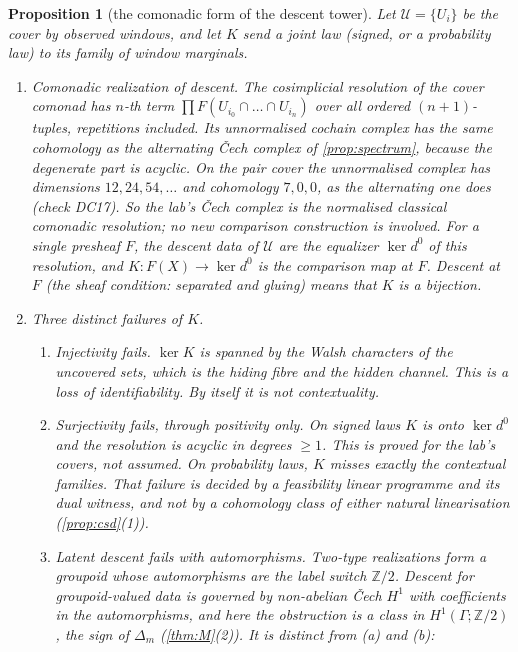 \documentclass[11pt]{article}
\newtheorem{proposition}{Proposition}\newtheorem{corollary}{Corollary}\newtheorem{lemma}{Lemma}
\theoremstyle{definition}\newtheorem{definition}{Definition}\newtheorem{remark}{Remark}
\begin{document}
\begin{proposition}[the comonadic form of the descent tower]\label{prop:comonadic}
Let $\mathcal U=\{U_i\}$ be the cover by observed windows, and let $K$ send a joint law (signed, or a probability law) to its family of
window marginals.
\begin{enumerate}
\item[(i)] \emph{Comonadic realization of descent.} The cosimplicial resolution of the cover comonad has $n$-th term
  $\prod F(U_{i_0}\cap\dots\cap U_{i_n})$ over all ordered $(n+1)$-tuples, repetitions included. Its unnormalised cochain complex has
  the same cohomology as the alternating Čech complex of \cref{prop:spectrum}, because the degenerate part is acyclic. On the pair cover
  the unnormalised complex has dimensions $12,24,54,\dots$ and cohomology $7,0,0$, as the alternating one does (check DC17). So the lab's
  Čech complex \emph{is} the normalised classical comonadic resolution; no new comparison construction is involved. For a single presheaf
  $F$, the descent data of $\mathcal U$ are the equalizer $\ker d^0$ of this resolution, and $K:F(X)\to\ker d^0$ is the comparison map
  at $F$. Descent at $F$ (the sheaf condition: separated and gluing) means that $K$ is a bijection.
\item[(ii)] \emph{Three distinct failures of $K$.}
  \begin{enumerate}
  \item[(a)] \emph{Injectivity fails.} $\ker K$ is spanned by the Walsh characters of the uncovered sets, which is the hiding fibre and
    the hidden channel. This is a loss of identifiability. By itself it is not contextuality.
  \item[(b)] \emph{Surjectivity fails, through positivity only.} On signed laws $K$ is onto $\ker d^0$ and the resolution is acyclic in
    degrees $\ge1$. This is proved for the lab's covers, not assumed. On probability laws, $K$ misses exactly the contextual families.
    That failure is decided by a feasibility linear programme and its dual witness, and not by a cohomology class of either natural
    linearisation (\cref{prop:csd}(1)).
  \item[(c)] \emph{Latent descent fails with automorphisms.} Two-type realizations form a groupoid whose automorphisms are the label switch
    $\mathbb Z/2$. Descent for groupoid-valued data is governed by non-abelian Čech $H^1$ with coefficients in the automorphisms, and
    here the obstruction is a class in $H^1(\Gamma;\mathbb Z/2)$, the sign of $\Delta_m$ (\cref{thm:M}(2)). It is distinct from (a) and (b):

\end{enumerate}
\end{enumerate}
\end{proposition}
\end{document}
